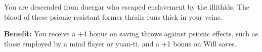 
You are descended from duergar who escaped enslavement by the illithids. The blood of these psionic-resistant former thralls runs thick in your veins.

\textbf{Benefit:} You receive a +4 bonus on saving throws against psionic effects, such as those employed by a mind flayer or yuan-ti, and a +1 bonus on Will saves.